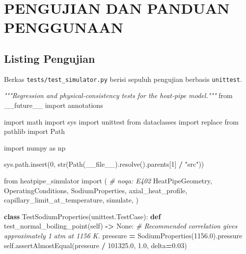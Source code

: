 \documentclass[
  12pt,a4paper,oneside]{report}
\newenvironment{Shaded}{\begin{snugshade}}{\end{snugshade}}
\newcommand{\BuiltInTok}[1]{#1}
\newcommand{\CommentTok}[1]{\textcolor[rgb]{0.56,0.35,0.01}{\textit{#1}}}
\newcommand{\DecValTok}[1]{\textcolor[rgb]{0.00,0.00,0.81}{#1}}
\newcommand{\FloatTok}[1]{\textcolor[rgb]{0.00,0.00,0.81}{#1}}
\newcommand{\ImportTok}[1]{#1}
\newcommand{\KeywordTok}[1]{\textcolor[rgb]{0.13,0.29,0.53}{\textbf{#1}}}
\newcommand{\NormalTok}[1]{#1}
\newcommand{\OperatorTok}[1]{\textcolor[rgb]{0.81,0.36,0.00}{\textbf{#1}}}
\newcommand{\StringTok}[1]{\textcolor[rgb]{0.31,0.60,0.02}{#1}}
\newcommand{\VariableTok}[1]{\textcolor[rgb]{0.00,0.00,0.00}{#1}}
\begin{document}
\hypertarget{pengujian-dan-panduan-penggunaan}{%
\chapter{PENGUJIAN DAN PANDUAN
PENGGUNAAN}\label{pengujian-dan-panduan-penggunaan}}

\hypertarget{listing-pengujian}{%
\section{Listing Pengujian}\label{listing-pengujian}}

Berkas \texttt{tests/test\_simulator.py} berisi sepuluh pengujian
berbasis \texttt{unittest}.

\begin{Shaded}
\begin{Highlighting}[]
\CommentTok{"""Regression and physical{-}consistency tests for the heat{-}pipe model."""}
\ImportTok{from}\NormalTok{ \_\_future\_\_ }\ImportTok{import}\NormalTok{ annotations}

\ImportTok{import}\NormalTok{ math}
\ImportTok{import}\NormalTok{ sys}
\ImportTok{import}\NormalTok{ unittest}
\ImportTok{from}\NormalTok{ dataclasses }\ImportTok{import}\NormalTok{ replace}
\ImportTok{from}\NormalTok{ pathlib }\ImportTok{import}\NormalTok{ Path}

\ImportTok{import}\NormalTok{ numpy }\ImportTok{as}\NormalTok{ np}

\NormalTok{sys.path.insert(}\DecValTok{0}\NormalTok{, }\BuiltInTok{str}\NormalTok{(Path(}\VariableTok{\_\_file\_\_}\NormalTok{).resolve().parents[}\DecValTok{1}\NormalTok{] }\OperatorTok{/} \StringTok{"src"}\NormalTok{))}

\ImportTok{from}\NormalTok{ heatpipe\_simulator }\ImportTok{import}\NormalTok{ (  }\CommentTok{\# noqa: E402}
\NormalTok{    HeatPipeGeometry,}
\NormalTok{    OperatingConditions,}
\NormalTok{    SodiumProperties,}
\NormalTok{    axial\_heat\_profile,}
\NormalTok{    capillary\_limit\_at\_temperature,}
\NormalTok{    simulate,}
\NormalTok{)}


\KeywordTok{class}\NormalTok{ TestSodiumProperties(unittest.TestCase):}
    \KeywordTok{def}\NormalTok{ test\_normal\_boiling\_point(}\VariableTok{self}\NormalTok{) }\OperatorTok{{-}\textgreater{}} \VariableTok{None}\NormalTok{:}
        \CommentTok{\# Recommended correlation gives approximately 1 atm at 1156 K.}
\NormalTok{        pressure }\OperatorTok{=}\NormalTok{ SodiumProperties(}\FloatTok{1156.0}\NormalTok{).pressure}
        \VariableTok{self}\NormalTok{.assertAlmostEqual(pressure }\OperatorTok{/} \FloatTok{101325.0}\NormalTok{, }\FloatTok{1.0}\NormalTok{, delta}\OperatorTok{=}\FloatTok{0.03}\NormalTok{)}


\end{Highlighting}
\end{Shaded}
\end{document}
